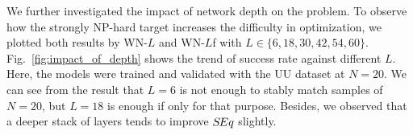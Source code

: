 We further investigated the impact of network depth on the problem.
To observe how the strongly NP-hard target increases the difficulty in optimization, we plotted both results by WN-$L$ and WN-$L$f with $L\in \{6,18,30,42,54,60\}$. 
Fig.~\ref{fig:impact_of_depth} shows the trend of success rate against different $L$. Here, the models were trained and validated with the UU dataset at $N=20$.
We can see from the result that $L=6$ is not enough to stably match samples of $N=20$, but $L=18$ is enough if only for that purpose.
Besides, we observed that a deeper stack of layers tends to improve $S\hspace{-0.1em}Eq$ slightly.

